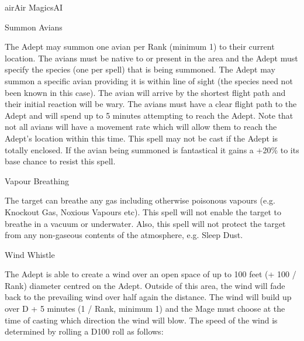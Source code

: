 \begin{College}[2.1]{air}{Air Magics}{AI}
\begin{spell}[G-7]{Summon Avians}

\begin{effects}
The Adept may summon one avian per Rank (minimum 1) to their current
location.  The avians must be native to or present in the area and the
Adept must specify the species (one per spell) that is being summoned.
The Adept may summon a specific avian providing it is within line of
sight (the species need not been known in this case). The avian will
arrive by the shortest flight path and their initial reaction will be
wary. The avians must have a clear flight path to the Adept and will
spend up to 5 minutes attempting to reach the Adept.  Note that not
all avians will have a movement rate which will allow them to reach
the Adept’s location within this time. This spell may not be cast if
the Adept is totally enclosed.  If the avian being summoned is
fantastical it gains a +20\% to its base chance to resist this spell.
\end{effects}
\end{spell}

\begin{spell}[G-8]{Vapour Breathing}

\begin{effects}
The target can breathe any gas including otherwise poisonous vapours
(e.g.  Knockout Gas, Noxious Vapours etc).  This spell will not enable
the target to breathe in a vacuum or underwater.  Also, this spell
will not protect the target from any non-gaseous contents of the
atmosphere, e.g. Sleep Dust.
\end{effects}
\end{spell}

\begin{spell}[G-9]{Wind Whistle}

\begin{effects}
The Adept is able to create a wind over an open space of up to 100
feet (+ 100 / Rank) diameter centred on the Adept.  Outside of this
area, the wind will fade back to the prevailing wind over half again
the distance. The wind will build up over D + 5 minutes (1 / Rank,
minimum 1) and the Mage must choose at the time of casting which
direction the wind will blow.  The speed of the wind is determined by
rolling a D100 roll as follows:


\end{effects}
\end{spell}
\end{College}
